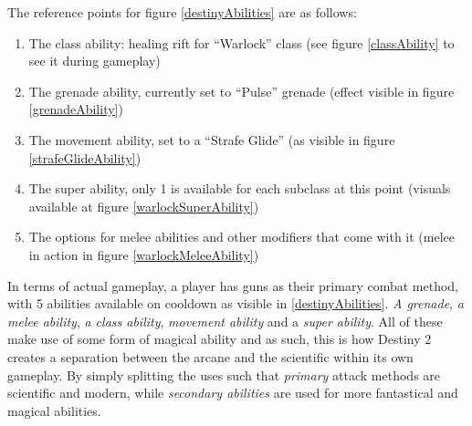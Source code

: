 \documentclass[12pt,a4paper]{report}
\begin{document}
The reference points for figure \ref{destinyAbilities} are as follows:
\begin{enumerate}
    \item The class ability: healing rift for ``Warlock'' class (see figure \ref{classAbility} to see it during gameplay)
    \item The grenade ability, currently set to ``Pulse'' grenade (effect visible in figure \ref{grenadeAbility})
    \item The movement ability, set to a ``Strafe Glide'' (as visible in figure \ref{strafeGlideAbility})
    \item The super ability, only 1 is available for each subclass at this point (visuals available at figure \ref{warlockSuperAbility})
    \item The options for melee abilities and other modifiers that come with it (melee in action in figure \ref{warlockMeleeAbility})
\end{enumerate}

In terms of actual gameplay, a player has guns as their primary combat method, with 5 abilities available on \gls{cooldown} as visible in \ref{destinyAbilities}. \textit{A grenade}, \textit{a melee ability}, \textit{a class ability}, \textit{movement ability} and a \textit{super ability}. All of these make use of some form of magical ability and as such, this is how Destiny 2 creates a separation between the arcane and the scientific within its own gameplay. By simply splitting the uses such that \textit{primary} attack methods are scientific and modern, while \textit{secondary abilities} are used for more fantastical and magical abilities.
\end{document}
